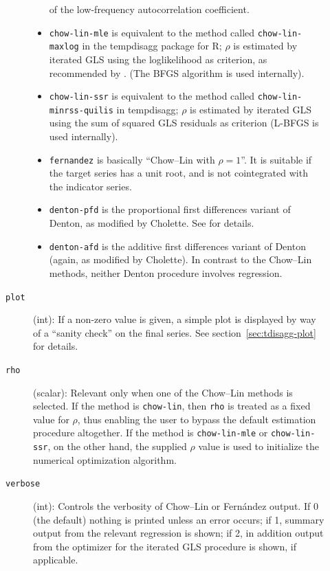 \begin{description}
\begin{description}
\begin{itemize}
      of the low-frequency autocorrelation coefficient.
    \item \texttt{chow-lin-mle} is equivalent to the method called
      \texttt{chow-lin-maxlog} in the \textsf{tempdisagg} package for
      \textsf{R}; $\rho$ is estimated by iterated GLS using the
      loglikelihood as criterion, as recommended by
      \cite{bournay79}. (The BFGS algorithm is used internally).
    \item \texttt{chow-lin-ssr} is equivalent to the method called
      \texttt{chow-lin-minrss-quilis} in \textsf{tempdisagg}; $\rho$
      is estimated by iterated GLS using the sum of squared GLS
      residuals as criterion (L-BFGS is used internally).
    \item \texttt{fernandez} is basically ``Chow--Lin with
      $\rho = 1$''. It is suitable if the target series has a unit
      root, and is not cointegrated with the indicator series.
    \item \texttt{denton-pfd} is the proportional first differences
      variant of Denton, as modified by Cholette. See
      \cite{difonzo2012} for details.
    \item \texttt{denton-afd} is the additive first differences
      variant of Denton (again, as modified by Cholette). In
      contrast to the Chow--Lin methods, neither Denton procedure
      involves regression.
    \end{itemize}
  \item[\texttt{plot}](int): If a non-zero value is given, a simple
    plot is displayed by way of a ``sanity check'' on the final
    series. See section~\ref{sec:tdisagg-plot} for details.
  \item[\texttt{rho}](scalar): Relevant only when one of the Chow--Lin
    methods is selected. If the method is \texttt{chow-lin}, then
    \texttt{rho} is treated as a fixed value for $\rho$, thus enabling
    the user to bypass the default estimation procedure altogether.
    If the method is \texttt{chow-lin-mle} or \texttt{chow-lin-ssr},
    on the other hand, the supplied $\rho$ value is used to initialize
    the numerical optimization algorithm.
  \item[\texttt{verbose}](int): Controls the verbosity of Chow--Lin or
    Fern\'andez output. If 0 (the default) nothing is printed unless
    an error occurs; if 1, summary output from the relevant regression
    is shown; if 2, in addition output from the optimizer for the
    iterated GLS procedure is shown, if applicable.
  \end{description}

\end{description}
